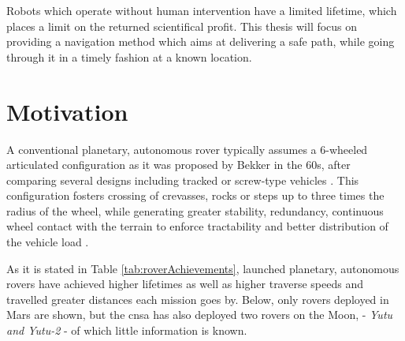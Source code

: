 Robots which operate without human intervention have a limited lifetime, which places a limit on the returned scientifical profit. This thesis will focus on providing a navigation method which aims at delivering a safe path, while going through it in a timely fashion at a known location.

\section{Motivation}
\label{section:motivation}

A conventional planetary, autonomous rover typically assumes a 6-wheeled articulated configuration as it was proposed by Bekker in the 60s, after comparing several designs including tracked or screw-type vehicles \cite{roboticsHandbook_chap55, Bekker1964}. This configuration fosters crossing of crevasses, rocks or steps up to three times the radius of the wheel, while generating greater stability, redundancy, continuous wheel contact with the terrain to enforce tractability and better distribution of the vehicle load \cite{Thoesen2021}.


As it is stated in Table \ref{tab:roverAchievements}, launched planetary, autonomous rovers have achieved higher lifetimes as well as higher traverse speeds and travelled greater distances each mission goes by. Below, only rovers deployed in Mars are shown, but the \acrshort{cnsa} has also deployed two rovers on the Moon, - \textit{Yutu and Yutu-2} - of which little information is known.

